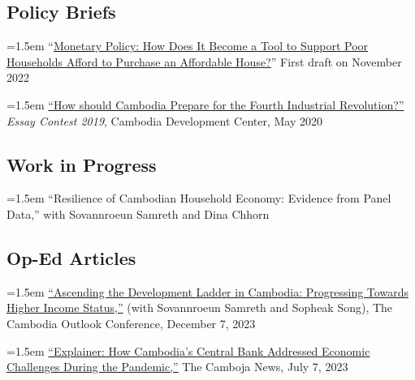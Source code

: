 \documentclass[10pt,a4paper]{article}
\begin{document}
\subsection*{Policy Briefs}
	
		\hangindent=1.5em
		“\href{}{Monetary Policy: How Does It Become a Tool to Support Poor Households Afford to Purchase an Affordable House?}” First draft on November 2022 \\ \vspace{-.5em}
	
		\hangindent=1.5em
		\href{https://cd-center.org/en/essay-contest-2019-first-place-winner/}{``How should Cambodia Prepare for the Fourth Industrial Revolution?''} \textit{Essay Contest 2019}, Cambodia Development Center, May 2020

\subsection*{Work in Progress}
	\hangindent=1.5em
	``Resilience of Cambodian Household Economy: Evidence from Panel Data,'' with Sovannroeun Samreth and Dina Chhorn

\subsection*{Op-Ed Articles}

	\hangindent=1.5em
	\href{https://coc2023.cdri.org.kh/ascending-the-development-ladder-in-cambodia-progressing-towards-higher-income-status/}{``Ascending the Development Ladder in Cambodia: Progressing Towards Higher Income Status,''} (with Sovannroeun Samreth and Sopheak Song), The Cambodia Outlook Conference, December 7, 2023\\ \vspace{-.5em}
	
	\hangindent=1.5em
	\href{https://cambojanews.com/explainer-how-cambodias-central-bank-addressed-economic-challenges-during-the-pandemic/}{``Explainer: How Cambodia's Central Bank Addressed Economic Challenges During the Pandemic,''} The Camboja News, July 7, 2023\\ \vspace{-.5em}
	
\end{document}
